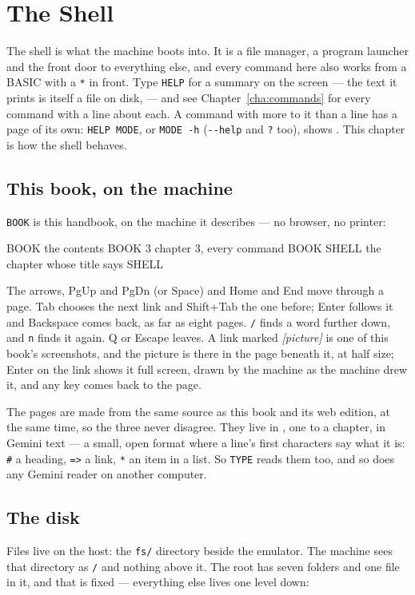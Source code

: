 \chapter{The Shell}\label{cha:shell}

The shell is what the machine boots into. It is a file manager, a program
launcher and the front door to everything else, and every command here
also works from a BASIC with a \verb|*| in front. Type \verb|HELP| for a
summary on the screen --- the text it prints is itself a file on disk,
 --- and see Chapter~\ref{cha:commands} for every
command with a line about each. A command with more to it than a line has a
page of its own: \verb|HELP MODE|, or \verb|MODE -h| (\verb|--help| and
\verb|?| too), shows . This chapter is how the shell behaves.

\section{This book, on the machine}\label{sec:book}
\verb|BOOK| is this handbook, on the machine it describes --- no browser,
no printer:

\begin{type}
BOOK              the contents
BOOK 3            chapter 3, every command
BOOK SHELL        the chapter whose title says SHELL
\end{type}

\noindent The arrows, PgUp and PgDn (or Space) and Home and End move
through a page. Tab chooses the next link and Shift+Tab the one before;
Enter follows it and Backspace comes back, as far as eight pages. \verb|/|
finds a word further down, and \verb|n| finds it again. Q or Escape
leaves. A link marked \emph{[picture]} is one of this book's screenshots,
and the picture is there in the page beneath it, at half size; Enter on the
link shows it full screen, drawn by the machine as the machine drew it, and
any key comes back to the page.

The pages are made from the same source as this book and its web edition,
at the same time, so the three never disagree. They live in
, one to a chapter, in Gemini text --- a small, open
format where a line's first characters say what it is: \verb|#| a
heading, \verb|=>| a link, \verb|*| an item in a list. So \verb|TYPE|
reads them too, and so does any Gemini reader on another computer.

\section{The disk}
Files live on the host: the \texttt{fs/} directory beside the emulator.
The machine sees that directory as \texttt{/} and nothing above it. The
root has seven folders and one file in it, and that is fixed --- everything
else lives one level down:


